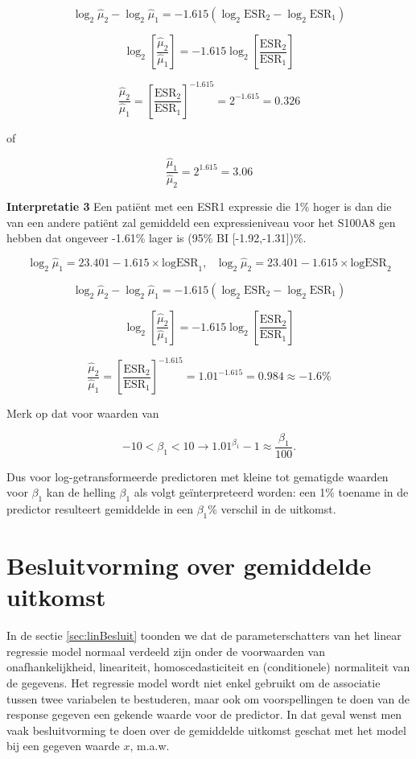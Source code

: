 \documentclass[
  12pt,dutch,coursenotes]{book}
\theoremstyle{definition}
\theoremstyle{definition}
\theoremstyle{definition}
\theoremstyle{remark}
\begin{document}
\[\log_2 \hat\mu_2-\log_2 \hat\mu_1=  -1.615 (\log_2 \text{ESR}_2-\log_2 \text{ESR}_1) \]

\[\log_2 \left[\frac{\hat\mu_2}{\hat\mu_1}\right]=  -1.615 \log_2\left[\frac{ \text{ESR}_2}{\text{ESR}_1}\right] \]

\[\frac{\hat\mu_2}{\hat\mu_1}=\left[\frac{ \text{ESR}_2}{\text{ESR}_1}\right]^{-1.615}=2^ {-1.615} =0.326\]

of

\[\frac{\hat\mu_1}{\hat\mu_2}=2^{1.615} =3.06\]

\textbf{Interpretatie 3}
Een patiënt met een ESR1 expressie die 1\% hoger is dan die van een andere patiënt zal gemiddeld een expressieniveau voor het S100A8 gen hebben dat ongeveer -1.61\% lager is (95\% BI {[}-1.92,-1.31{]})\%.

\[\log_2 \hat\mu_1=23.401  -1.615 \times \text{logESR}_1,\text{ } \log_2 \hat\mu_2=23.401  -1.615 \times \text{logESR}_2 \]

\[\log_2 \hat\mu_2-\log_2 \hat \mu_1=  -1.615 (\log_2 \text{ESR}_2-\log_2 \text{ESR}_1) \]

\[\log_2 \left[\frac{\hat\mu_2}{\hat\mu_1}\right]=  -1.615 \log_2\left[\frac{ \text{ESR}_2}{\text{ESR}_1}\right] \]

\[\frac{\hat\mu_2}{\hat\mu_1}=\left[\frac{ \text{ESR}_2}{\text{ESR}_1}\right]^{-1.615}=1.01^ {-1.615} =0.984 \approx -1.6\%\]

Merk op dat voor waarden van

\[−10< \beta_1<10 \rightarrow 1.01 ^{\beta_1}−1 \approx \frac{\beta_1}{100}.\]

Dus voor log-getransformeerde predictoren met kleine tot gematigde waarden voor \(\beta_1\) kan de helling \(\beta_1\) als volgt geïnterpreteerd worden: een 1\% toename in de predictor resulteert gemiddelde in een \(\beta_1\)\% verschil in de uitkomst.

\hypertarget{besluitvorming-over-gemiddelde-uitkomst}{%
\section{Besluitvorming over gemiddelde uitkomst}\label{besluitvorming-over-gemiddelde-uitkomst}}

In de sectie \ref{sec:linBesluit} toonden we dat de parameterschatters van het linear regressie model normaal verdeeld zijn onder de voorwaarden van onafhankelijkheid, lineariteit, homoscedasticiteit en (conditionele) normaliteit van de gegevens.
Het regressie model wordt niet enkel gebruikt om de associatie tussen twee variabelen te bestuderen, maar ook om voorspellingen te doen van de response gegeven een gekende waarde voor de predictor.
In dat geval wenst men vaak besluitvorming te doen over de gemiddelde uitkomst geschat met het model bij een gegeven waarde \(x\), m.a.w.
\end{document}
